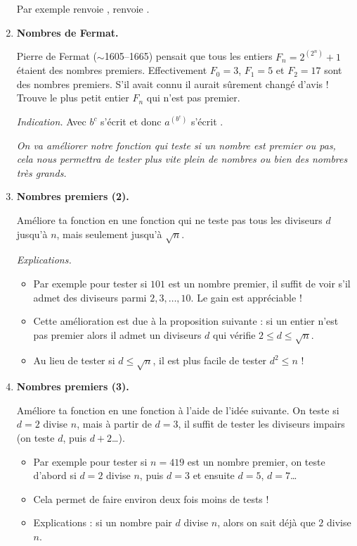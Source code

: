 \documentclass[11pt,class=report,crop=false]{standalone}
\begin{document}
\begin{activite}
\begin{enumerate}
  Par exemple  renvoie ,  renvoie .
  
  \item \textbf{Nombres de Fermat.}
  
  Pierre de Fermat ($\sim$1605--1665) pensait que tous les entiers $F_n = 2^{(2^n)}+1$ étaient des nombres premiers. Effectivement $F_0=3$, $F_1=5$ et $F_2=17$
  sont des nombres premiers. S'il avait connu \Python{} il aurait sûrement changé d'avis ! Trouve le plus petit entier $F_n$ qui n'est pas premier.
  
  \emph{Indication.} Avec \Python{} $b^c$ s'écrit  et donc
  $a^{(b^c)}$ s'écrit .
  
  \bigskip
  
  \emph{On va améliorer notre fonction qui teste si un nombre est premier ou pas, cela nous permettra de tester plus vite plein de nombres ou bien des nombres très grands.}  
  
  \item \textbf{Nombres premiers (2).}
  
   Améliore ta fonction en une fonction  qui ne teste pas tous les diviseurs $d$ jusqu'à $n$, mais seulement jusqu'à $\sqrt{n}$.
   
  \emph{Explications.}
  \begin{itemize}
    \item Par exemple pour tester si $101$ est un nombre premier, il suffit de voir s'il admet des diviseurs parmi $2,3,\ldots,10$. Le gain est appréciable !
    
    \item Cette amélioration est due à la proposition suivante : si un entier n'est pas premier alors il admet un diviseurs $d$ qui vérifie $2 \le d \le \sqrt{n}$.
    
    \item Au lieu de tester si $d \le \sqrt{n}$, il est plus facile de tester $d^2 \le n$ !
   \end{itemize} 
  
  
  \item \textbf{Nombres premiers (3).}  
  
  Améliore ta fonction en une fonction  à l'aide de l'idée suivante.  On teste si $d=2$ divise $n$, mais à partir de $d=3$, il suffit de tester les diviseurs impairs (on teste $d$, puis $d+2$\ldots).
 
 \begin{itemize}
   \item Par exemple pour tester si $n = 419$ est un nombre premier, on teste d'abord si $d=2$ divise $n$, puis $d=3$ et ensuite $d=5$, $d=7$\ldots 
   \item Cela permet de faire environ deux fois moins de tests !
   \item Explications : si un nombre pair $d$ divise $n$, alors on sait déjà que $2$ divise $n$.   
   \end{itemize}
  

\end{enumerate}
\end{activite}
\end{document}
